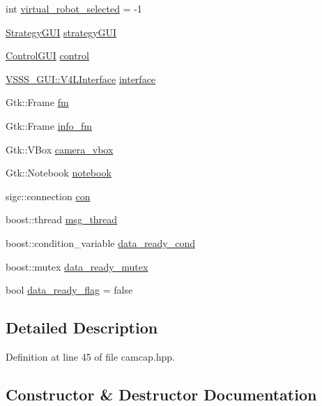 \begin{DoxyCompactItemize}
\item 
int \hyperlink{class_cam_cap_a6709fb57a514b9aa6ee943b2b57fdbe7}{virtual\+\_\+robot\+\_\+selected} = -\/1
\item 
\hyperlink{class_strategy_g_u_i}{Strategy\+G\+UI} \hyperlink{class_cam_cap_a71ae899fee6c1b02de3c373965208e52}{strategy\+G\+UI}
\item 
\hyperlink{class_control_g_u_i}{Control\+G\+UI} \hyperlink{class_cam_cap_a0e2b26d564d6baa6f5f60ce7227ad53f}{control}
\item 
\hyperlink{class_v_s_s_s___g_u_i_1_1_v4_l_interface}{V\+S\+S\+S\+\_\+\+G\+U\+I\+::\+V4\+L\+Interface} \hyperlink{class_cam_cap_a58002893dfb61307042ddbba0c362dcd}{interface}
\item 
Gtk\+::\+Frame \hyperlink{class_cam_cap_ad0377b692fbf2edec6d8cc3dfdc65c2d}{fm}
\item 
Gtk\+::\+Frame \hyperlink{class_cam_cap_a411c71ae763f50f8a8752bb9a6ddc4d1}{info\+\_\+fm}
\item 
Gtk\+::\+V\+Box \hyperlink{class_cam_cap_a4a00cd71f3f2ab88b985f53e527613fd}{camera\+\_\+vbox}
\item 
Gtk\+::\+Notebook \hyperlink{class_cam_cap_acccac8a77e94926ef3d4a79bd9b94f56}{notebook}
\item 
sigc\+::connection \hyperlink{class_cam_cap_a608a3c47ba3c1c046794e3f074b97cea}{con}
\item 
boost\+::thread \hyperlink{class_cam_cap_a0aedb5217ab6aa3d7c383a6f39c940cd}{msg\+\_\+thread}
\item 
boost\+::condition\+\_\+variable \hyperlink{class_cam_cap_a609ffa71782939a4428485a191202bbc}{data\+\_\+ready\+\_\+cond}
\item 
boost\+::mutex \hyperlink{class_cam_cap_af1a617d50c6eed145fe96fd4b40e73bf}{data\+\_\+ready\+\_\+mutex}
\item 
bool \hyperlink{class_cam_cap_a6ebbdd1217a68d77959aec45c7ea59e2}{data\+\_\+ready\+\_\+flag} = false
\end{DoxyCompactItemize}


\subsection{Detailed Description}


Definition at line 45 of file camcap.\+hpp.



\subsection{Constructor \& Destructor Documentation}
\mbox{\label{class_cam_cap_afe0db98a5f72bc9b261dcb78e2840da6}} 
